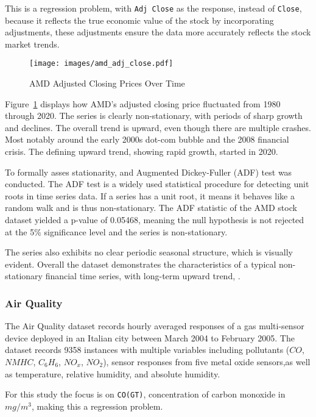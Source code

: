 \documentclass[conference]{IEEEtran}
\begin{document}
This is a regression problem, with \texttt{Adj Close} as the response, instead of \texttt{Close}, because it reflects the true economic value of the stock by incorporating adjustments, these adjustments ensure the data more accurately reflects the stock market trends.

\begin{figure}[H]
    \centering
    \texttt{[image: images/amd\_adj\_close.pdf]}
    \caption{AMD Adjusted Closing Prices Over Time}
    \label{fig:amd_adj_close}
\end{figure}

Figure~\ref{fig:amd_adj_close} displays how AMD's adjusted closing price fluctuated from 1980 through 2020. The series is clearly non-stationary, with periods of sharp growth and declines. The overall trend is upward, even though there are multiple crashes. Most notably around the early 2000s dot-com bubble and the 2008 financial crisis. The defining upward trend, showing rapid growth, started in 2020.

To formally asses stationarity, and Augmented Dickey-Fuller (ADF) test was conducted. The ADF test is a widely used statistical procedure for detecting unit roots in time series data. If a series has a unit root, it means it behaves like a random walk and is thus non-stationary. The ADF statistic of the AMD stock dataset yielded a p-value of 0.05468, meaning the null hypothesis is not rejected at the 5\% significance level and the series is non-stationary.

The series also exhibits no clear periodic seasonal structure, which is visually evident. Overall the dataset demonstrates the characteristics of a typical non-stationary financial time series, with long-term upward trend, \cite{stock_market_dataset_amd}.

\subsubsection{\textbf{Air Quality}}

The Air Quality dataset records hourly averaged responses of a gas multi-sensor device deployed in an Italian city between March 2004 to February 2005. The dataset records 9358 instances with multiple variables including pollutants ($CO$, $NMHC$, $C_6H_6$, $NO_x$, $NO_2$), sensor responses from five metal oxide sensors,as well as temperature, relative humidity, and absolute humidity.

For this study the focus is on \texttt{CO(GT)}, concentration of carbon monoxide in $mg/m^3$, making this a regression problem.
\end{document}
